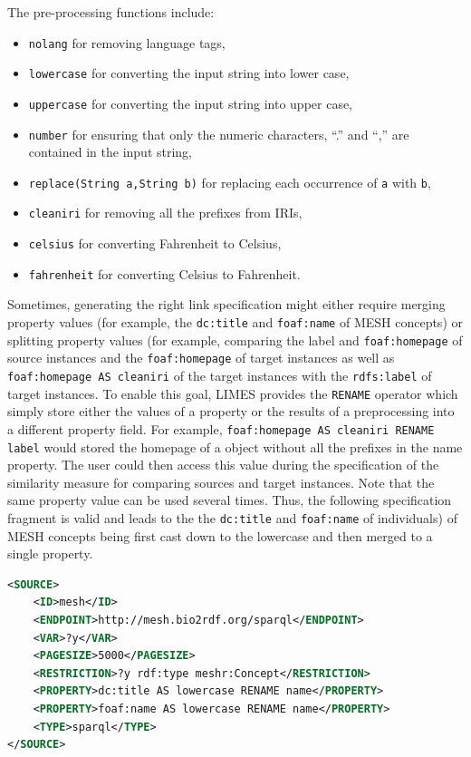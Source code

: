 \documentclass[a4paper, 11pt]{article}
\begin{document}
 The pre-processing functions include: 
\begin{itemize}
\item \texttt{nolang} for removing language tags, 
\item \texttt{lowercase} for converting the input string into lower case,  
\item \texttt{uppercase} for converting the input string into upper case, 
\item \texttt{number} for ensuring that only the numeric characters, ``.'' and ``,'' are contained in the input string,
\item \texttt{replace(String a,String b)} for replacing each occurrence of \texttt{a} with \texttt{b},
\item \texttt{cleaniri} for removing all the prefixes from IRIs,
\item \texttt{celsius} for converting Fahrenheit to Celsius,
\item \texttt{fahrenheit} for converting Celsius to Fahrenheit.
\end{itemize}

Sometimes, generating the right link specification might either require merging property values (for example, the \texttt{dc:title} and \texttt{foaf:name} of MESH concepts) or splitting property values (for example, comparing the label and \texttt{foaf:homepage} of source instances and the \texttt{foaf:homepage} of target instances as well as \texttt{foaf:homepage AS cleaniri} of the target instances with the \texttt{rdfs:label} of target instances. To enable this goal, LIMES provides the \texttt{RENAME} operator which simply store either the values of a property or the results of a preprocessing into a different property field. For example, \texttt{foaf:homepage AS cleaniri RENAME label} would stored the homepage of a object without all the prefixes in the name property. The user could then access this value during the specification of the similarity measure for comparing sources and target instances. Note that the same property value can be used several times. Thus, the following specification fragment is valid and leads to the the \texttt{dc:title} and \texttt{foaf:name} of individuals)  of MESH concepts being first cast down to the lowercase and then merged to a single property.

\begin{ttfamily}
\begin{lstlisting}[language=XML,basicstyle=\scriptsize,numberstyle=\tiny]
<SOURCE>
	<ID>mesh</ID>
	<ENDPOINT>http://mesh.bio2rdf.org/sparql</ENDPOINT>
	<VAR>?y</VAR>
	<PAGESIZE>5000</PAGESIZE>
	<RESTRICTION>?y rdf:type meshr:Concept</RESTRICTION>
	<PROPERTY>dc:title AS lowercase RENAME name</PROPERTY>
	<PROPERTY>foaf:name AS lowercase RENAME name</PROPERTY>
	<TYPE>sparql</TYPE>
</SOURCE>
\end{lstlisting}
\end{ttfamily}
\end{document}
